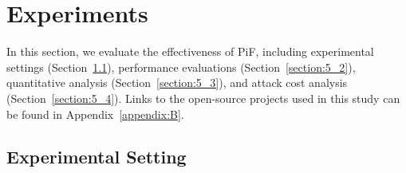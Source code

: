 \section{Experiments}
\label{section:5}
In this section, we evaluate the effectiveness of PiF, including experimental settings (Section~\ref{section:5_1}), performance evaluations (Section~\ref{section:5_2}), quantitative analysis (Section~\ref{section:5_3}), and attack cost analysis (Section~\ref{section:5_4}).
Links to the open-source projects used in this study can be found in Appendix~\ref{appendix:B}.

\subsection{Experimental Setting}
\label{section:5_1}


